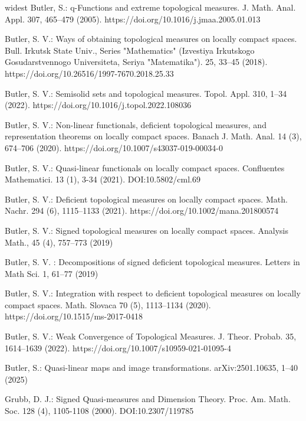 \documentclass[sn-mathphys-num]{sn-jnl}%
\theoremstyle{thmstyleone}%
\theoremstyle{definition}
\begin{document}
\begin{thebibliography}{widest}
  Butler, S.:   q-Functions and extreme topological measures. J. Math. Anal. Appl. 307, 465--479 (2005). https://doi.org/10.1016/j.jmaa.2005.01.013   

  Butler, S. V.:  Ways of obtaining topological measures on locally compact spaces. 
  Bull. Irkutsk State Univ., Series "Mathematics" (Izvestiya Irkutskogo Gosudarstvennogo Universiteta, Seriya "Matematika"). 25, 33--45 (2018).
  https://doi.org/10.26516/1997-7670.2018.25.33
  
    Butler, S. V.:  Semisolid sets and topological measures. Topol. Appl. 310, 1--34  (2022).
    https://doi.org/10.1016/j.topol.2022.108036

     Butler, S. V.:  Non-linear functionals, deficient topological measures, and representation theorems on locally compact spaces. 
     Banach J. Math. Anal. 14 (3), 674--706 (2020). https://doi.org/10.1007/s43037-019-00034-0

  Butler, S. V.: Quasi-linear functionals on locally compact spaces. Confluentes Mathematici.  13 (1), 3-34 (2021). DOI:10.5802/cml.69

  Butler, S. V.: Deficient topological measures on locally compact spaces. Math. Nachr.  294 (6), 1115--1133 (2021).
  https://doi.org/10.1002/mana.201800574  

   Butler, S. V.: Signed topological measures on locally compact spaces.  Analysis Math., 45 (4), 757--773 (2019)   
           
   Butler, S. V. : Decompositions of signed deficient topological measures.  Letters in Math Sci.  1, 61--77 (2019)

Butler, S. V.: Integration with respect to deficient topological measures on locally compact spaces. Math. Slovaca 70 (5), 1113--1134 (2020).
 https://doi.org/10.1515/ms-2017-0418  
     
Butler, S. V.: Weak Convergence of Topological Measures. J. Theor. Probab. 35, 1614--1639 (2022). https://doi.org/10.1007/s10959-021-01095-4

 Butler, S.: Quasi-linear maps and image transformations. arXiv:2501.10635, 1--40 (2025)
 
  Grubb, D. J.:  Signed Quasi-measures and Dimension Theory. Proc. Am. Math. Soc. 128 (4), 1105-1108 (2000). DOI:10.2307/119785  
       

\end{thebibliography}
\end{document}
